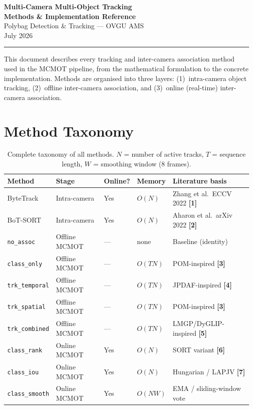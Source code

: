 \documentclass[11pt,a4paper]{article}
\newcommand{\code}[1]{\texttt{\small#1}}
\newcommand{\lit}[1]{\textbf{\small[#1]}}
\begin{document}
\begin{center}
  {\LARGE\bfseries\color{navyblue}
    Multi-Camera Multi-Object Tracking\\[4pt]
    Methods \& Implementation Reference}\\[8pt]
  {\large Polybag Detection \& Tracking — OVGU AMS}\\[4pt]
  {\color{darkgray} July 2026}
\end{center}

\vspace{4pt}
\noindent\rule{\linewidth}{1.5pt}
\vspace{4pt}

\noindent
This document describes every tracking and inter-camera association method
used in the MCMOT pipeline, from the mathematical formulation to the
concrete implementation.  Methods are organised into three layers:
(1)~intra-camera object tracking,
(2)~offline inter-camera association, and
(3)~online (real-time) inter-camera association.

\section{Method Taxonomy}

\begin{table}[h]
\centering
\renewcommand{\arraystretch}{1.35}
\begin{tabularx}{\linewidth}{L{2.8cm} L{2.8cm} C{1.5cm} C{1.5cm} L{5.2cm}}
\toprule
\textbf{Method} & \textbf{Stage} & \textbf{Online?} & \textbf{Memory} & \textbf{Literature basis} \\
\midrule
ByteTrack  & Intra-camera  & Yes & $O(N)$ & Zhang et al.\ ECCV 2022 \lit{1} \\
BoT-SORT   & Intra-camera  & Yes & $O(N)$ & Aharon et al.\ arXiv 2022 \lit{2} \\
\midrule
\code{no\_assoc}          & Offline MCMOT & —  & none   & Baseline (identity) \\
\code{class\_only}        & Offline MCMOT & —  & $O(TN)$ & POM-inspired \lit{3} \\
\code{trk\_temporal}      & Offline MCMOT & —  & $O(TN)$ & JPDAF-inspired \lit{4} \\
\code{trk\_spatial}       & Offline MCMOT & —  & $O(TN)$ & POM-inspired \lit{3} \\
\code{trk\_combined}      & Offline MCMOT & —  & $O(TN)$ & LMGP/DyGLIP-inspired \lit{5} \\
\midrule
\code{class\_rank}        & Online MCMOT  & Yes & $O(N)$ & SORT variant \lit{6} \\
\code{class\_iou}         & Online MCMOT  & Yes & $O(N)$ & Hungarian / LAPJV \lit{7} \\
\code{class\_smooth}      & Online MCMOT  & Yes & $O(NW)$ & EMA / sliding-window vote \\
\bottomrule
\end{tabularx}
\caption{Complete taxonomy of all methods.  $N$ = number of active tracks,
  $T$ = sequence length, $W$ = smoothing window (8 frames).}
\end{table}
\end{document}
